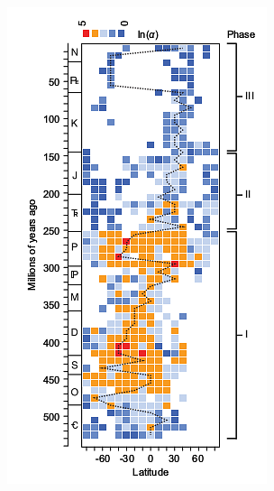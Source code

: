 \documentclass{beamer}
\begin{document}
\begin{frame}
\begin{columns}
\begin{column}{0.4\textwidth}
    \end{column}
    \begin{column}{0.6\textwidth}
      \includegraphics[width=\textwidth,height=0.7\textheight,keepaspectratio=true]{figure/powell_2015_a}
    \end{column}
  \end{columns}

\end{frame}
\end{document}
